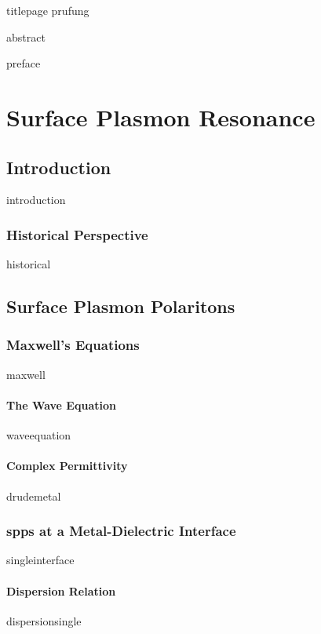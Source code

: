 \documentclass[12pt,a4paper,titlepage,onecolumn]{report}
\begin{document}
{titlepage}
{prufung}

{abstract}

\tableofcontents
\listoffigures
\listoftables


\setcounter{page}{27}

\label{ch:allintro}
{preface}

\part{Surface Plasmon Resonance}\label{part:spr}
\chapter{Introduction}\label{ch:sprintro}
{introduction}
\section{Historical Perspective}
{historical}

\chapter{Surface Plasmon Polaritons}\label{ch:existence}
\section{Maxwell's Equations}
{maxwell}
\subsection{The Wave Equation}
{waveequation}
\subsection{Complex Permittivity}
{drudemetal}
\section{\glspl{spp} at a Metal-Dielectric Interface}
{singleinterface}
\subsection{Dispersion Relation}
{dispersionsingle}
\end{document}
